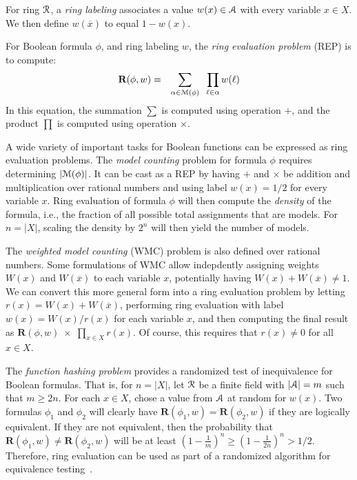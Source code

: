 \documentclass[letterpaper,USenglish,cleveref, autoref, thm-restate]{lipics-v2021}
\newcommand{\obar}[1]{\overline{#1}}
\newcommand{\lit}{\ell}
\newcommand{\varset}{X}
\newcommand{\ring}{{\cal R}}
\newcommand{\dset}{{\cal A}}
\newcommand{\rep}{\textbf{R}}
\newcommand{\radd}{+}
\newcommand{\rmul}{\times}
\newcommand{\modelset}{{\cal M}}
\begin{document}
\begin{definition}
  For ring $\ring$, a {\em ring labeling} associates a value $w(x) \in \dset$ with
  every variable $x \in \varset$.  We then define $w(\obar{x})$ to equal $1-w(x)$.

  For Boolean formula $\phi$, and ring labeling $w$, the {\em ring evaluation problem} (REP) is to compute:
  \begin{eqnarray}
    \rep(\phi, w) & = & \sum_{\alpha \in \modelset(\phi)} \;\; \prod_{\lit \in \alpha} w(\ell) \label{eqn:rep}
  \end{eqnarray}
  In this equation, the summation $\sum$ is computed using operation $\radd$, and the product $\prod$ is computed using operation $\rmul$.
\label{def:labeling}
\end{definition}

A wide variety of important tasks for Boolean functions can be
expressed as ring evaluation problems.  The 
{\em model counting} problem for formula $\phi$ requires determining $|\modelset(\phi)|$.
It can be cast as a REP by having $\radd$ and
$\rmul$ be addition and multiplication over rational numbers and using
label $w(x) = 1/2$ for every variable $x$.  
Ring evaluation of formula $\phi$ will then compute the {\em density} of
the formula, i.e., the fraction of all possible total assignments that are
models.  For $n = |\varset|$, scaling the density by $2^n$ will then
yield the number of models.

The {\em weighted model counting} (WMC) problem is also defined over
rational numbers.  Some formulations of WMC allow 
indepdently assigning weights $W(x)$ and $W(\obar{x})$ to each variable $x$, potentially having
$W(x) + W(\obar{x}) \not = 1$.
We can convert this more general form into a
ring evaluation problem by letting $r(x) = W(x) + W(\obar{x})$,
performing ring evaluation with label $w(x) = W(x)/r(x)$ for each
variable $x$, and then computing the final result as $\rep(\phi, w)\;
\rmul\; \prod_{x \in \varset} r(x)$.  Of course, this requires that $r(x) \not = 0$ for all $x \in \varset$.

The {\em function hashing problem} provides a randomized test
of inequivalence for Boolean formulas.  That is, for $n = |\varset|$, let $\ring$ be a
finite  field with $|\dset| = m$ such that $m \geq 2 n$.  For each $x \in \varset$, chose a value from $\dset$ at random for $w(x)$.  Two formulas
$\phi_1$ and $\phi_2$ will clearly have $\rep(\phi_1, w) = \rep(\phi_2, w)$
if they are logically equivalent.  If they are not equivalent, then
the probability that $\rep(\phi_1, w) \not = \rep(\phi_2, w)$ will be at
least $\left(1-\frac{1}{m}\right)^n \geq \left(1-\frac{1}{2n}\right)^n > 1/2$.
Therefore, ring evaluation can be used as part of a
randomized algorithm for equivalence testing~\cite{blum:ipl:1980}.
\end{document}
